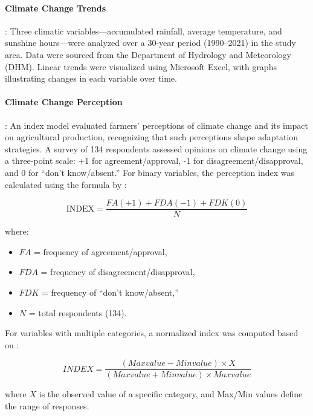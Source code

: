 \paragraph{Climate Change Trends} : 
Three climatic variables---accumulated rainfall, average temperature, and sunshine hours---were analyzed over a 30-year period (1990--2021) in the study area. Data were sourced from the Department of Hydrology and Meteorology (DHM). Linear trends were visualized using Microsoft Excel, with graphs illustrating changes in each variable over time.

\paragraph{Climate Change Perception}: 
An index model evaluated farmers’ perceptions of climate change and its impact on agricultural production, recognizing that such perceptions shape adaptation strategies. A survey of 134 respondents assessed opinions on climate change using a three-point scale: +1 for agreement/approval, -1 for disagreement/disapproval, and 0 for “don’t know/absent.” For binary variables, the perception index was calculated using the formula by \citep{dahalNutrientManagementSustainability2021}:

\[
\text{INDEX} = \frac{FA(+1) + FDA(-1) + FDK(0)}{N}
\]

where:
\begin{itemize}
    \item $FA$ = frequency of agreement/approval,
    \item $FDA$ = frequency of disagreement/disapproval,
    \item $FDK$ = frequency of “don’t know/absent,”
    \item $N$ = total respondents (134).
\end{itemize}

For variables with multiple categories, a normalized index was computed based on \citep{nguyenduycanAssessingLivelihoodVulnerability2019}:

$$ INDEX = \frac{(Max value - Min value) \times X}{(Max value + Min value) \times Max value} $$

where $X$ is the observed value of a specific category, and Max/Min values define the range of responses.
